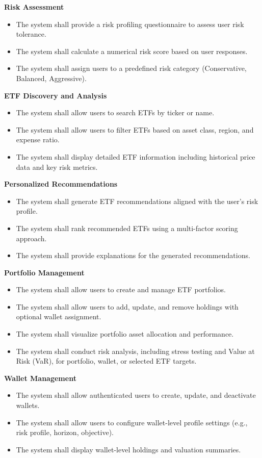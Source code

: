 \textbf{Risk Assessment}
\begin{itemize}
    \item The system shall provide a risk profiling questionnaire to assess user risk tolerance.
    \item The system shall calculate a numerical risk score based on user responses.
    \item The system shall assign users to a predefined risk category (Conservative, Balanced, Aggressive).
\end{itemize}

\textbf{ETF Discovery and Analysis}
\begin{itemize}
    \item The system shall allow users to search ETFs by ticker or name.
    \item The system shall allow users to filter ETFs based on asset class, region, and expense ratio.
    \item The system shall display detailed ETF information including historical price data and key risk metrics.
\end{itemize}

\textbf{Personalized Recommendations}
\begin{itemize}
    \item The system shall generate ETF recommendations aligned with the user’s risk profile.
    \item The system shall rank recommended ETFs using a multi-factor scoring approach.
    \item The system shall provide explanations for the generated recommendations.
\end{itemize}

\textbf{Portfolio Management}
\begin{itemize}
    \item The system shall allow users to create and manage ETF portfolios.
    \item The system shall allow users to add, update, and remove holdings with optional wallet assignment.
    \item The system shall visualize portfolio asset allocation and performance.
    \item The system shall conduct risk analysis, including stress testing and Value at Risk (VaR), for portfolio, wallet, or selected ETF targets.
\end{itemize}

\textbf{Wallet Management}
\begin{itemize}
    \item The system shall allow authenticated users to create, update, and deactivate wallets.
    \item The system shall allow users to configure wallet-level profile settings (e.g., risk profile, horizon, objective).
    \item The system shall display wallet-level holdings and valuation summaries.
\end{itemize}

